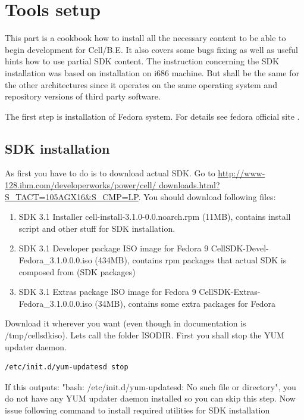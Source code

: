 \chapter{Tools setup}
\label{toolsSetup}

\par
This part is a cookbook how to install all the necessary content to be able to begin development for \mbox{Cell/B.E.}
It also covers some bugs fixing as well as useful hints how to use partial SDK content.
The instruction concerning the SDK installation was based on installation on i686 machine.
But shall be the same for the other architectures since it operates on the same operating system and repository versions of third party software.

\par
The first step is installation of Fedora system.
For details see fedora official site \cite{fedorasite}.

\section{SDK installation}

As first you have to do is to download actual SDK.
Go to \url{http://www-128.ibm.com/developerworks/power/cell/ downloads.html?S_TACT=105AGX16&S_CMP=LP}.
You should download following files:

\begin{enumerate}
\item SDK 3.1 Installer
cell-install-3.1.0-0.0.noarch.rpm  (11MB), contains install script and other stuff for SDK installation.
\item SDK 3.1 Developer package ISO image for Fedora 9
CellSDK-Devel-Fedora\_3.1.0.0.0.iso  (434MB), contains rpm packages that actual SDK is composed from (SDK packages)
\item SDK 3.1 Extras package ISO image for Fedora 9
CellSDK-Extras-Fedora\_3.1.0.0.0.iso  (34MB), contains some extra packages for Fedora
\end{enumerate}

Download it wherever you want (even though in documentation is /tmp/cellsdkiso).
Lets call the folder ISODIR.
First you shall stop the YUM updater daemon.

\begin{verbatim}
/etc/init.d/yum-updatesd stop
\end{verbatim}

If this outputs: "bash: /etc/init.d/yum-updatesd: No such file or directory", you do not have any YUM updater daemon installed so you can skip this step.
Now issue following command to install required utilities for SDK installation


